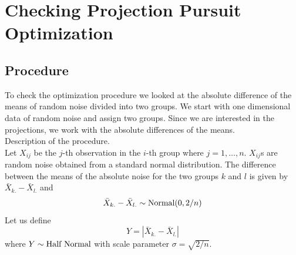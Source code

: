 \documentclass[12]{article}
\begin{document}
%
%
%
%
%
%

\section{Checking Projection Pursuit Optimization} \label{sec:largep}


 

\subsection{Procedure}

To check the optimization procedure we looked at the absolute difference of the means of random noise divided into two groups. We start with one dimensional data of random noise and assign two groups. Since we are interested in the projections, we work with the absolute differences of the means. \\

{\color{red} Description of the procedure. }\\

Let $X_{ij}$ be the $j$-th observation in the $i$-th group where $j = 1, \dots, n$. $X_{ij}$s are random noise obtained from a standard normal distribution. The difference between the means of the absolute noise for the two groups $k$ and $l$ is given by $\bar{X}_{k.} - \bar{X}_{l.}$ and $$\bar{X}_{k.} - \bar{X}_{l.} \sim \hbox{Normal}(0, 2/n)$$ Let us define $$Y  = |\bar{X}_{k.} - \bar{X}_{l.}|$$ where $Y \sim \hbox{Half Normal}$ with scale parameter $ \sigma = \sqrt{2/n}$. \\
\end{document}
